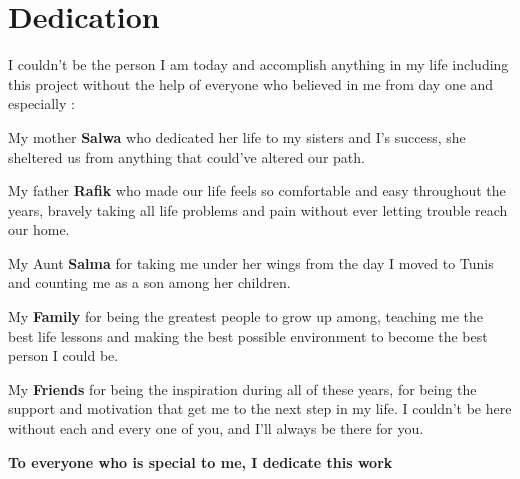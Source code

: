 \chapter*{Dedication}

I couldn't be the person I am today and accomplish anything in my life including this project without the help of everyone who believed in me from day one and especially :\newline


My mother \textbf{Salwa} who dedicated her life to my sisters and I's success, she sheltered us from anything that could've altered our path.\newline

My father \textbf{Rafik}  who made our life feels so comfortable and easy throughout the years, bravely taking all life problems and pain without ever letting trouble reach our home.\newline

My Aunt \textbf{Salma} for taking me under her wings from the day I moved to Tunis and counting me as a son among her children.\newline

My \textbf{Family} for being the greatest people to grow up among, teaching me the best life lessons and making the best possible environment to become the best person I could be.\newline

My \textbf{Friends} for being the inspiration during all of these years, for being the support and motivation that get me to the next step in my life. I couldn't be here without each and every one of you, and I'll always be there for you.\newline

\begin{center}
	\textbf{To everyone who is special to me, I dedicate this work}
\end{center}
